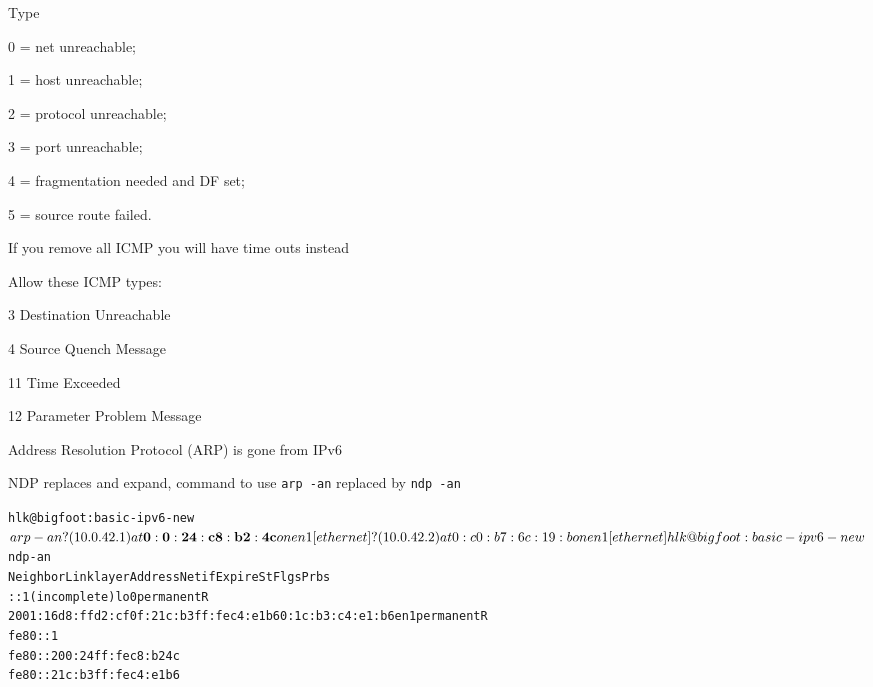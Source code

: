 \documentclass[Screen16to9,17pt]{foils}
\begin{document}

\begin{list1}
\item Type
\begin{list2}
\item 0 = net unreachable;
\item 1 = host unreachable;
\item 2 = protocol unreachable;
\item 3 = port unreachable;
\item 4 = fragmentation needed and DF set;
\item 5 = source route failed.
\end{list2}
\item If you remove all ICMP you will have time outs instead
\item Allow these ICMP types:
\begin{list2}
\item 3 Destination Unreachable
\item 4 Source Quench Message
\item 11 Time Exceeded
\item 12 Parameter Problem Message
\end{list2}
\end{list1}




\begin{list1}
\item Address Resolution Protocol (ARP) is gone from IPv6
\item NDP replaces and expand, command to use \verb+arp -an+ replaced by \verb+ndp -an+
\end{list1}


\begin{alltt}
\small
hlk@bigfoot:basic-ipv6-new$ arp -an
? (10.0.42.1) at{\bf 0:0:24:c8:b2:4c} on en1 [ethernet]
? (10.0.42.2) at 0:c0:b7:6c:19:b on en1 [ethernet]
hlk@bigfoot:basic-ipv6-new$ ndp -an
Neighbor                      Linklayer Address  Netif Expire    St Flgs Prbs
::1                           (incomplete)         lo0 permanent R
2001:16d8:ffd2:cf0f:21c:b3ff:fec4:e1b6 0:1c:b3:c4:e1:b6 en1 permanent R
fe80::1%lo0                   (incomplete)         lo0 permanent R
fe80::200:24ff:fec8:b24c%en1 {\bf 0:0:24:c8:b2:4c}      en1 8h54m51s  S  R
fe80::21c:b3ff:fec4:e1b6%en1  0:1c:b3:c4:e1:b6     en1 permanent R
\end{alltt}
\end{document}
